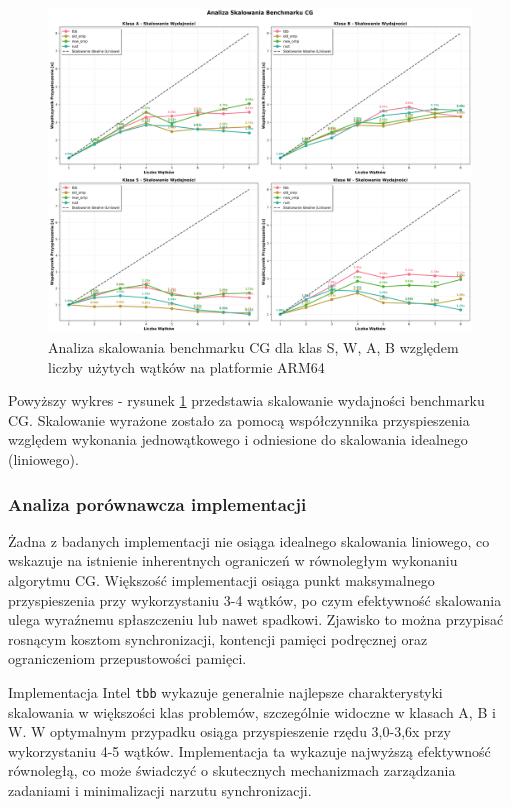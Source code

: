 \begin{figure}[H]
    \centering
    \includegraphics[width=\textwidth]{analiza/images/parallel/cg/arm/cg_analiza_skalowania.png}
    \caption{Analiza skalowania benchmarku CG dla klas S, W, A, B względem liczby użytych wątków na platformie ARM64}
    \label{cg_analiza_skalowania}
\end{figure}
Powyższy wykres - rysunek \ref{cg_analiza_skalowania} przedstawia skalowanie wydajności benchmarku CG. Skalowanie wyrażone zostało za pomocą współczynnika przyspieszenia względem wykonania jednowątkowego i odniesione do skalowania idealnego (liniowego).

\subsubsection{Analiza porównawcza implementacji}
Żadna z badanych implementacji nie osiąga idealnego skalowania liniowego, co wskazuje na istnienie inherentnych ograniczeń w równoległym wykonaniu algorytmu CG. Większość implementacji osiąga punkt maksymalnego przyspieszenia przy wykorzystaniu 3-4 wątków, po czym efektywność skalowania ulega wyraźnemu spłaszczeniu lub nawet spadkowi. Zjawisko to można przypisać rosnącym kosztom synchronizacji, kontencji pamięci podręcznej oraz ograniczeniom przepustowości pamięci.

Implementacja Intel \texttt{tbb} wykazuje generalnie najlepsze charakterystyki skalowania w większości klas problemów, szczególnie widoczne w klasach A, B i W. W optymalnym przypadku osiąga przyspieszenie rzędu 3,0-3,6x przy wykorzystaniu 4-5 wątków. Implementacja ta wykazuje najwyższą efektywność równoległą, co może świadczyć o skutecznych mechanizmach zarządzania zadaniami i minimalizacji narzutu synchronizacji.

